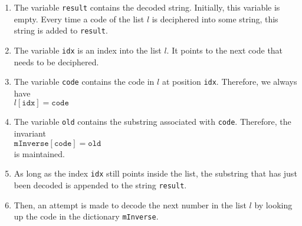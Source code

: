 \begin{enumerate}
\item The variable \texttt{result} contains the decoded string.  Initially, this variable is empty.
      Every time a code of the list $l$ is deciphered into some string, this string is added to
      \texttt{result}.
\item The variable \texttt{idx} is an index into the list $l$.  It points to the next code that
      needs to be deciphered.
\item The variable \texttt{code} contains the code in $l$ at position \texttt{idx}.  Therefore, we
      always have
      \\[0.2cm]
      \hspace*{1.3cm}
      $l[\texttt{idx}] = \texttt{code}$
\item The variable \texttt{old} contains the substring associated with \texttt{code}.  Therefore,
      the invariant
      \\[0.2cm]
      \hspace*{1.3cm}
      $\texttt{mInverse}[\texttt{code}] = \texttt{old}$
      \\[0.2cm]
      is maintained.
\item As long as the index \texttt{idx} still points inside the list, the substring 
      that has just been decoded is appended to the string \texttt{result}.
\item Then, an attempt is made to decode the next number in the list $l$ by looking up the code
      in the dictionary \texttt{mInverse}.  
      

\end{enumerate}

